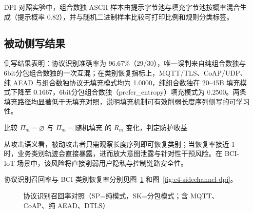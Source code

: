 DPI 对照实验中，组合数独 ASCII 样本由提示字节池与填充字节池按概率混合生成（提示概率 0.82），并与随机二进制样本比较可打印比例和规则分类标签。

\subsection{被动侧写结果}
侧写结果表明：协议识别准确率为 96.67\%（29/30），唯一误判来自纯组合数独与 6bit分包组合数独的一次互混；在类别恢复指标上，MQTT/TLS、CoAP/UDP、纯 AEAD 与组合数独协议无填充模式均为 1.0000，纯组合数独在 20--45B 填充模式下降至 0.1667，6bit分包组合数独（prefer\_entropy）填充模式为 0.2500。两条填充路径均显著低于无填充对照，说明填充机制可有效削弱长度序列侧写的可学习性\cite{alwhbi2024encrypted,hou2024encmalware}。

\begin{algorithm}[H]
\small
\caption{BCI 类别侧写评估：无填充为 100\%，随机填充显著降低恢复率}
\label{alg:c4-sidechannel-eval}
比较 $\Pi_m=\varnothing$ 与 $\Pi_m=\text{随机填充}$ 的 $R_m$ 变化，判定防护收益\;
\end{algorithm}

从攻击语义看，被动攻击者只需观察长度序列即可恢复类别；当恢复率接近 1 时，业务类别轨迹会直接暴露，进而放大意图泄露与针对性干预风险。在 BCI-IoT 场景中，该风险将直接削弱用户隐私与控制链路安全性\cite{alwhbi2024encrypted,kapitonova2022framework,meng2024adversarial}。

协议识别召回率与 BCI 类别恢复率分别见图~\ref{fig:c4-proto-recall-extended} 和图~\ref{fig:c4-sidechannel-dpi}。

\begin{figure}[!b]
\centering
\small
{}
\caption{协议识别召回率对照（SP=纯模式，SK=分包模式；含 MQTT、CoAP、纯 AEAD、DTLS）}
\label{fig:c4-proto-recall-extended}
\end{figure}


